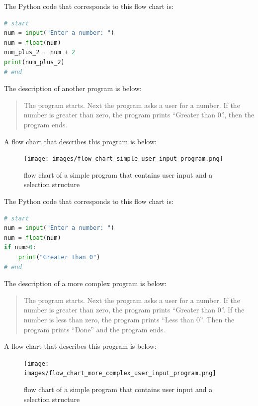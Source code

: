 \documentclass{book}
\begin{document}
The Python code that corresponds to this flow chart is:

\begin{lstlisting}[language=Python]
# start
num = input("Enter a number: ")
num = float(num)
num_plus_2 = num + 2
print(num_plus_2)
# end
\end{lstlisting}
    




    
        The description of another program is below:

\begin{quote}
The program starts. Next the program asks a user for a number. If the
number is greater than zero, the program prints ``Greater than 0'', then
the program ends.
\end{quote}

A flow chart that describes this program is below:

\begin{figure}
\centering
\texttt{[image: images/flow\_chart\_simple\_user\_input\_program.png]}
\caption{flow chart of a simple program that contains user input and a
selection structure}
\end{figure}

The Python code that corresponds to this flow chart is:

\begin{lstlisting}[language=Python]
# start
num = input("Enter a number: ")
num = float(num)
if num>0:
    print("Greater than 0")
# end
\end{lstlisting}
    




    
        The description of a more complex program is below:

\begin{quote}
The program starts. Next the program asks a user for a number. If the
number is greater than zero, the program prints ``Greater than 0''. If
the number is less than zero, the program prints ``Less than 0''. Then
the program prints ``Done'' and the program ends.
\end{quote}

A flow chart that describes this program is below:

\begin{figure}
\centering
\texttt{[image: images/flow\_chart\_more\_complex\_user\_input\_program.png]}
\caption{flow chart of a simple program that contains user input and a
selection structure}
\end{figure}
\end{document}
